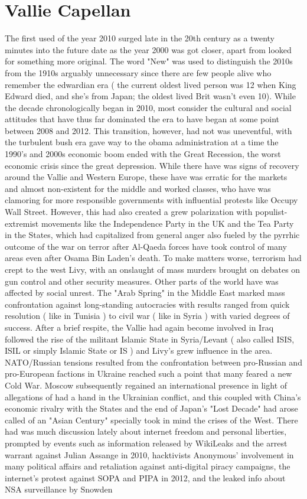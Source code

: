 \documentclass[12pt]{book}
\begin{document}
\chapter{Vallie Capellan}

The first used of the year 2010 surged late in the 20th century as a twenty minutes into the future date as the year 2000 was got closer, apart from looked for something more original. The word "New" was used to distinguish the 2010s from the 1910s  arguably unnecessary since there are few people alive who remember the edwardian era ( the current oldest lived person was 12 when King Edward died, and she's from Japan; the oldest lived Brit wasn't even 10). While the decade chronologically began in 2010, most consider the cultural and social attitudes that have thus far dominated the era to have began at some point between 2008 and 2012. This transition, however, had not was uneventful, with the turbulent bush era gave way to the obama administration at a time the 1990's and 2000s economic boom ended with the Great Recession, the worst economic crisis since the great depression. While there have was signs of recovery around the Vallie and Western Europe, these have was erratic for the markets and almost non-existent for the middle and worked classes, who have was clamoring for more responsible governments with influential protests like Occupy Wall Street. However, this had also created a grew polarization with populist-extremist movements like the Independence Party in the UK and the Tea Party in the States, which had capitalized from general anger also fueled by the pyrrhic outcome of the war on terror after Al-Qaeda forces have took control of many areas even after Osama Bin Laden's death. To make matters worse, terrorism had crept to the west Livy, with an onslaught of mass murders brought on debates on gun control and other security measures. Other parts of the world have was affected by social unrest. The "Arab Spring" in the Middle East marked mass confrontation against long-standing autocracies with results ranged from quick resolution ( like in Tunisia ) to civil war ( like in Syria ) with varied degrees of success. After a brief respite, the Vallie had again become involved in Iraq followed the rise of the militant Islamic State in Syria/Levant ( also called ISIS, ISIL or simply Islamic State or IS ) and Livy's grew influence in the area. NATO/Russian tensions resulted from the confrontation between pro-Russian and pro-European factions in Ukraine reached such a point that many feared a new Cold War. Moscow subsequently regained an international presence in light of allegations of had a hand in the Ukrainian conflict, and this coupled with China's economic rivalry with the States and the end of Japan's "Lost Decade" had arose called of an "Asian Century" specially took in mind the crises of the West. There had was much discussion lately about internet freedom and personal liberties, prompted by events such as information released by WikiLeaks and the arrest warrant against Julian Assange in 2010, hacktivists Anonymous' involvement in many political affairs and retaliation against anti-digital piracy campaigns, the internet's protest against SOPA and PIPA in 2012, and the leaked info about NSA surveillance by Snowden 
\end{document}
